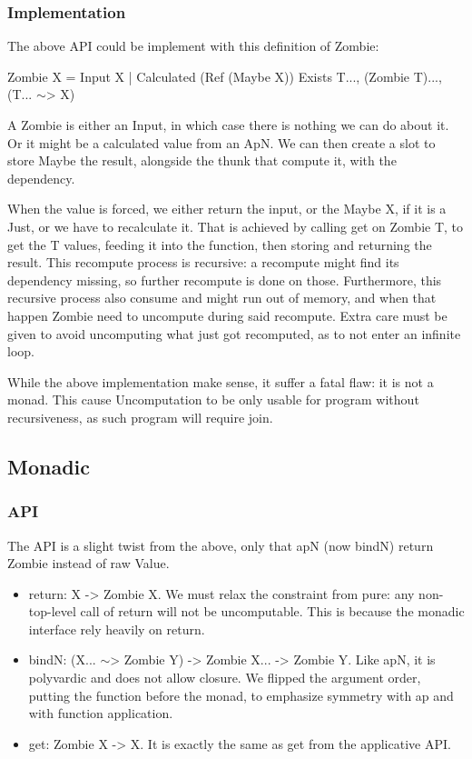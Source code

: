 \subsubsection{Implementation}
The above API could be implement with this definition of Zombie:

Zombie X = Input X | Calculated (Ref (Maybe X)) Exists T..., (Zombie T)..., (T... $\sim$> X)

A Zombie is either an Input, in which case there is nothing we can do about it.
Or it might be a calculated value from an ApN. We can then create a slot to store Maybe the result, alongside the thunk that compute it, with the dependency.

When the value is forced, we either return the input, or the Maybe X, if it is a Just, or we have to recalculate it. That is achieved by calling get on Zombie T, to get the T values, feeding it into the function, then storing and returning the result. This recompute process is recursive: a recompute might find its dependency missing, so further recompute is done on those. Furthermore, this recursive process also consume and might run out of memory, and when that happen Zombie need to uncompute during said recompute. Extra care must be given to avoid uncomputing what just got recomputed, as to not enter an infinite loop.

While the above implementation make sense, it suffer a fatal flaw: it is not a monad. This cause Uncomputation to be only usable for program without recursiveness, as such program will require join.
\subsection{Monadic}
\subsubsection{API}
The API is a slight twist from the above, only that apN (now bindN) return Zombie instead of raw Value.
\begin{itemize}
	\item return: X -> Zombie X. We must relax the constraint from pure: any non-top-level call of return will not be uncomputable. This is because the monadic interface rely heavily on return. \\
	\item bindN: (X... $\sim$> Zombie Y) -> Zombie X... -> Zombie Y. Like apN, it is polyvardic and does not allow closure. We flipped the argument order, putting the function before the monad, to emphasize symmetry with ap and with function application. \\
	\item get: Zombie X -> X. It is exactly the same as get from the applicative API. \\
\end{itemize}
